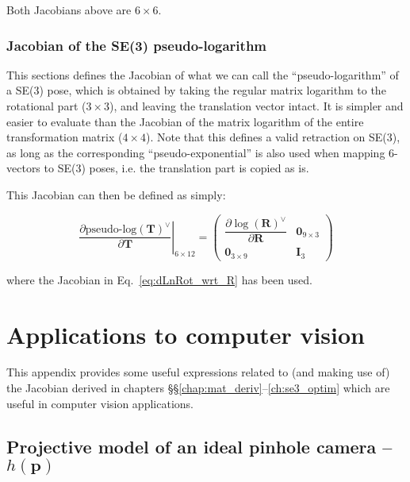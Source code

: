 \documentclass[a4paper,11pt]{report}
\begin{document}
Both Jacobians above are $6 \times 6$.


\subsection{Jacobian of the SE(3) pseudo-logarithm}
\label{sect:eq:jacob_dLnSE3_dSE3}

This sections defines the Jacobian of what we can call the ``pseudo-logarithm'' of a SE(3) pose, 
which is obtained by taking the regular matrix logarithm to the rotational part ($3 \times 3$), 
and leaving the translation vector intact. It is simpler and easier to evaluate than 
the Jacobian of the matrix logarithm of the entire transformation matrix ($4 \times 4$). 
Note that this defines a valid retraction on SE(3), as long as the corresponding ``pseudo-exponential'' 
is also used when mapping 6-vectors to SE(3) poses, i.e. the translation part is copied as is.

This Jacobian can then be defined as simply:

\begin{equation}
\label{eq:dLnSE3_wrt_SE3}
\left.
 \frac{\partial \text{pseudo-log}(\mathbf{T})^\vee }{\partial \mathbf{T}}
\right|_{6 \times 12}
=
\left(
\begin{array}{c|c}
 \dfrac{\partial \log(\mathbf{R})^\vee }{\partial \mathbf{R}} & \mathbf{0}_{9 \times 3} \\
\hline
 \mathbf{0}_{3 \times 9} & \mathbf{I}_3
\end{array}
\right)
\end{equation}

\noindent where the Jacobian in Eq.~\ref{eq:dLnRot_wrt_R} has been used.


\appendix

\chapter{Applications to computer vision}
\label{ch:apx:cv}

This appendix provides some useful expressions related to (and making use of)
the Jacobian derived in chapters \S\S\ref{chap:mat_deriv}--\ref{ch:se3_optim}
which are useful
in computer vision applications.


\section{Projective model of an ideal pinhole camera -- $h(\mathbf{p})$}
\end{document}
